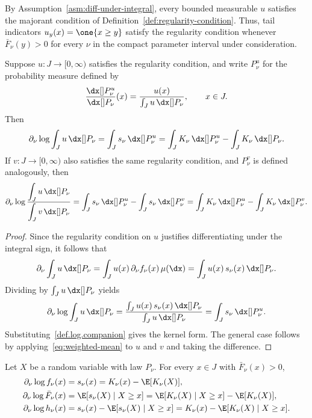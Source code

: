 \documentclass[11pt]{article}
\begin{document}
By Assumption~\ref{asm:diff-under-integral}, every bounded measurable \(u\) satisfies the majorant condition of Definition~\ref{def:regularity-condition}. Thus, tail indicators \(u_y(x)=\one\{x\ge y\}\) satisfy the regularity condition whenever \(\bar F_\nu(y)>0\) for every \(\nu\) in the compact parameter interval under consideration.
\begin{prop}
\label{prop:weighted-identity}
Suppose \(u:J\to[0,\infty)\) satisfies the regularity condition, and write \(P_\nu^u\) for the probability measure defined by
\[
\frac{\dx[]P_\nu^u}{\dx[]P_\nu}(x)=\frac{u(x)}{\int_J u\,\dx[] P_\nu },\qquad x\in J.
\]
Then
\begin{equation}\label{eq:weighted-mean}
\partial_\nu\log\int_J u\,\dx[]P_\nu
=\int_J s_\nu\,\dx[]P_\nu^u
=\int_J K_\nu\,\dx[]P_\nu^u-\int_J K_\nu\,\dx[]P_\nu.
\end{equation}
If \(v:J\to[0,\infty)\) also satisfies the same regularity condition, and \(P_\nu^v\) is defined analogously, then
\[
\partial_\nu\log\dfrac{\displaystyle\int_J u\,\dx[]P_\nu}{\displaystyle\int_J v\,\dx[]P_\nu}
=\int_J s_\nu\,\dx[]P_\nu^u-\int_J s_\nu\,\dx[]P_\nu^v
=\int_J K_\nu\,\dx[]P_\nu^u-\int_J K_\nu\,\dx[]P_\nu^v.
\]
\end{prop}

\begin{proof}
Since the regularity condition on \(u\) justifies differentiating under the integral sign, it follows that 
\[
\partial_\nu\int_J u\,\dx[]P_\nu
=\int_J u(x)\,\partial_\nu f_\nu(x)\,\mu(\dx)
=\int_J u(x)\,s_\nu(x)\,\dx[]P_\nu.
\]
Dividing by \(\int_J u\,\dx[]P_\nu\) yields
\[
\partial_\nu\log\int_J u\,\dx[]P_\nu
=\frac{\int_J u(x)\,s_\nu(x)\,\dx[]P_\nu}
      {\int_J u\,\dx[]P_\nu}
=\int_J s_\nu\,\dx[]P_\nu^u.
\]
Substituting~\eqref{def.log.companion} gives the kernel form. The general case follows by applying~\eqref{eq:weighted-mean} to \(u\) and
\(v\) and taking the difference.
\end{proof}

\begin{lem}
\label{lem:three-levels}
Let $X$ be a random variable with law $P_\nu$. For every \(x\in J\) with \(\bar F_\nu(x)>0\),
\begin{alignat}{2}
\partial_\nu\log f_\nu(x) &=s_\nu(x)=K_\nu(x)-\E[K_\nu(X)], \label{eq:lr-kernel}\\
\partial_\nu\log\bar F_\nu(x) &=\E[s_\nu(X)\mid X\ge x]=\E[K_\nu(X)\mid X\ge x]-\E[K_\nu(X)], \label{eq:st-kernel}\\
\partial_\nu\log h_\nu(x) &=s_\nu(x)-\E[s_\nu(X)\mid X\ge x]=K_\nu(x)-\E[K_\nu(X)\mid X\ge x]. \label{eq:hr-kernel}
\end{alignat}
\end{lem}
\end{document}
